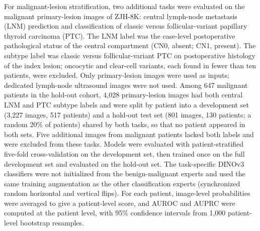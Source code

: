 \documentclass[fleqn,10pt]{wlscirep}
\begin{document}
For malignant-lesion stratification, two additional tasks were evaluated on the malignant primary-lesion images of ZJH-8K: central lymph-node metastasis (LNM) prediction and classification of classic versus follicular-variant papillary thyroid carcinoma (PTC). The LNM label was the case-level postoperative pathological status of the central compartment (CN0, absent; CN1, present). The subtype label was classic versus follicular-variant PTC on postoperative histology of the index lesion; oncocytic and clear-cell variants, each found in fewer than ten patients, were excluded. Only primary-lesion images were used as inputs; dedicated lymph-node ultrasound images were not used. Among 647 malignant patients in the hold-out cohort, 4,028 primary-lesion images had both central LNM and PTC subtype labels and were split by patient into a development set (3,227 images, 517 patients) and a hold-out test set (801 images, 130 patients; a random 20\% of patients) shared by both tasks, so that no patient appeared in both sets. Five additional images from malignant patients lacked both labels and were excluded from these tasks. Models were evaluated with patient-stratified five-fold cross-validation on the development set, then trained once on the full development set and evaluated on the hold-out set. The task-specific DINOv3 classifiers were not initialized from the benign-malignant experts and used the same training augmentation as the other classification experts (synchronized random horizontal and vertical flips). For each patient, image-level probabilities were averaged to give a patient-level score, and AUROC and AUPRC were computed at the patient level, with 95\% confidence intervals from 1,000 patient-level bootstrap resamples.
\end{document}
